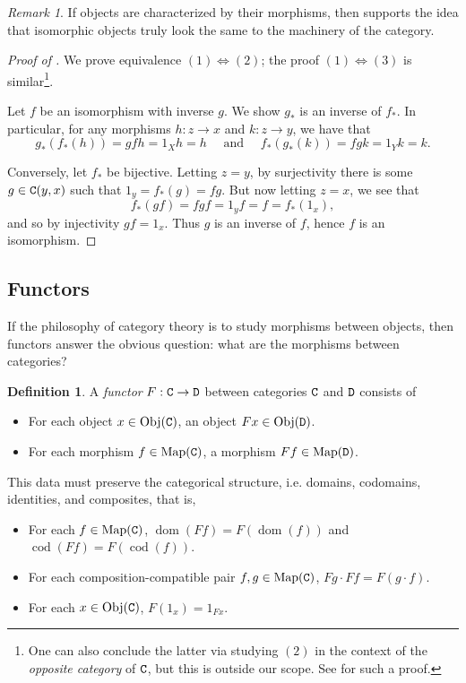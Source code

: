 \documentclass[11 pt]{amsart}
\theoremstyle{plain}   %
\theoremstyle{definition}
\newtheorem{defn}{Definition}[section]
\theoremstyle{remark}
\newtheorem{rem}{Remark}[section]
\numberwithin{equation}{section}
\DeclareMathOperator{\dom}{dom}
\DeclareMathOperator{\cod}{cod}
\newcommand{\cat}[1]{{\normalfont\texttt{#1}}}
\newcommand{\Obj}[1]{\text{Obj}(\cat{#1})}
\newcommand{\Map}[1]{\text{Map}(\cat{#1})}
\begin{document}
\begin{rem}
	If objects are characterized by their morphisms, then  supports the idea that isomorphic objects truly look the
	same to the machinery of the category.
\end{rem}

\begin{proof}[Proof of ]
	We prove equivalence $(1)\Leftrightarrow(2)$; the proof $(1)\Leftrightarrow(3)$ is
	similar\footnote{One can also conclude the latter via studying $(2)$ in the
		context of the \emph{opposite category} of $\cat{C}$, but this is outside our
		scope. See \cite[Lemma 1.2.3]{Riehl} for such a proof.}.

	Let $f$ be an isomorphism with inverse $g$. We show $g_*$ is an inverse of
	$f_*$. In particular, for any morphisms $h: z\rightarrow x$ and $k:
		z\rightarrow y$, we have that
	$$g_*(f_*(h)) = gfh = 1_Xh = h
		\quad
		\text{ and }
		\quad
		f_*(g_*(k)) = fgk = 1_Yk = k.$$

	Conversely, let $f_*$ be bijective. Letting $z = y$, by surjectivity there is
	some $g\in\cat{C}(y, x)$ such that $1_y = f_*(g) = fg$. But now letting $z =
		x$, we see that $$f_*(gf) = fgf = 1_yf = f = f_*(1_x),$$ and so by injectivity
	$gf = 1_x$. Thus $g$ is an inverse of $f$, hence $f$ is an isomorphism.
	\qedhere

\end{proof}

\subsection{Functors}

If the philosophy of category theory is to study morphisms between objects, then
functors answer the obvious question: what are the morphisms between categories?

\begin{defn}
	A \emph{functor} $F: \cat{C}\rightarrow\cat{D}$ between
	categories $\cat{C}$ and $\cat{D}$ consists of
	\begin{itemize}
		\item For each object $x\in\Obj{C}$, an object $Fx\in\Obj{D}$.
		\item For each morphism $f\in\Map{C}$, a morphism $Ff\in\Map{D}$.
	\end{itemize}

	This data must preserve the categorical structure, i.e. domains, codomains,
	identities, and composites, that is,

	\begin{itemize}
		\item For each $f\in\Map{C}$, $\dom(Ff) = F(\dom(f))$ and $\cod(Ff) =
			      F(\cod(f))$.
		\item For each composition-compatible pair $f,g\in\Map{C}$, $Fg\cdot Ff =
			      F(g\cdot f)$.
		\item For each $x\in\Obj{C}$, $F(1_x) = 1_{Fx}$.
	\end{itemize}
\end{defn}
\end{document}
